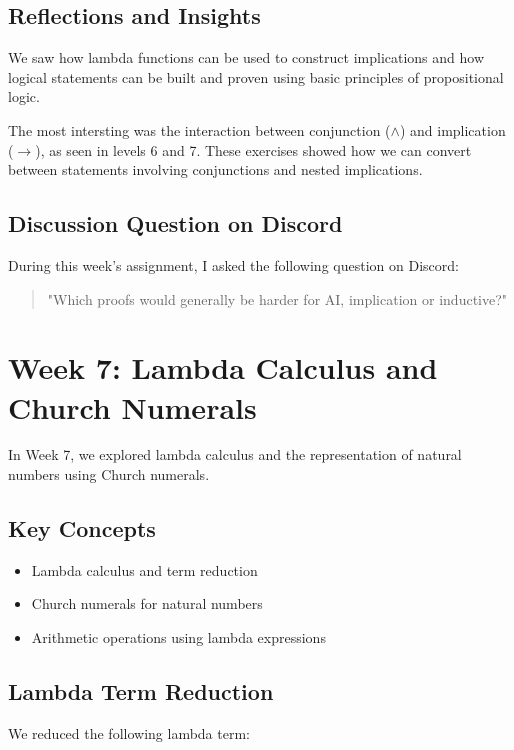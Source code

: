 \documentclass{article}
\begin{document}
\subsection*{Reflections and Insights}

We saw how lambda functions can be used to construct implications and how logical statements can be built and proven using basic principles of propositional logic.

The most intersting was the interaction between conjunction (\(\land\)) and implication (\(\rightarrow\)), as seen in levels 6 and 7. These exercises showed how we can convert between statements involving conjunctions and nested implications.
\subsection*{Discussion Question on Discord}

During this week's assignment, I asked the following question on Discord:

\begin{quote}
\small
"Which proofs would generally be harder for AI, implication or inductive?"
\end{quote}

\section{Week 7: Lambda Calculus and Church Numerals}
\label{sec:week7}

In Week 7, we explored lambda calculus and the representation of natural numbers using Church numerals.

\subsection*{Key Concepts}

\begin{itemize}
    \item Lambda calculus and term reduction
    \item Church numerals for natural numbers
    \item Arithmetic operations using lambda expressions
\end{itemize}

\subsection*{Lambda Term Reduction}

We reduced the following lambda term:
\end{document}
